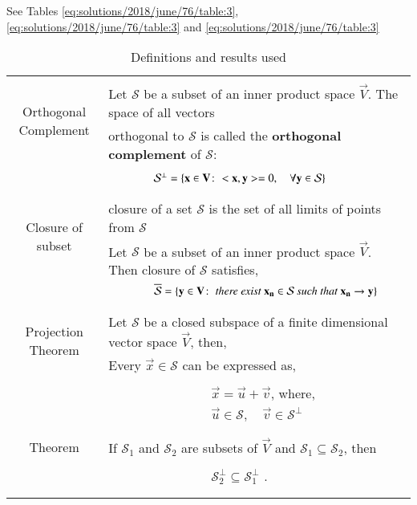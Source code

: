 See Tables     \ref{eq:solutions/2018/june/76/table:3},     
\ref{eq:solutions/2018/june/76/table:3} and     \ref{eq:solutions/2018/june/76/table:3}



\onecolumn
\begin{longtable}{|c|l|}
    \hline
	\multirow{3}{*}{Orthogonal Complement} 
	& \\
	& Let $\mathcal{S}$ be a subset of an inner product space $\vec{V}$. The space of all vectors\\
	&orthogonal to $\mathcal{S}$ is called the \textbf{orthogonal complement} of $\mathcal{S}$:\\
	&\\
	&$\qquad\qquad\mathcal{S}^{\perp}=\left\{\mathbf{x}\in\mathbf{V}\colon<\mathbf{x},\mathbf{y}>=0,\quad\forall \mathbf{y}\in\mathcal{S}\right\}$\\
	&\\
	\hline
	\multirow{3}{*}{Closure of subset} 
	& \\
	& closure of a set $\mathcal{S}$ is the set of all limits of points from $\mathcal{S}$\\
	& Let $\mathcal{S}$ be a subset of an inner product space $\vec{V}$. Then closure of $\mathcal{S}$ satisfies,\\
	&$\qquad\qquad\overline{\mathcal{S}}=\left\{\mathbf{y}\in\mathbf{V}\colon \textit{ there exist } \mathbf{x_n}\in\mathcal{S}\textit{ such that } \mathbf{x_n}\rightarrow \mathbf{y}\right\}$\\
	&\\
	\hline
	\multirow{3}{*}{Projection Theorem} 
	& \\
	&  Let $\mathcal{S}$ be a closed subspace of a finite dimensional vector space $\vec{V}$, then,\\
	&Every $\vec{x}\in \mathcal{S}$ can be expressed as,\\
	&\\
	&$\qquad\qquad\qquad\qquad \vec{x} = \vec{u} + \vec{v}$, where,\\
	&$\qquad\qquad\qquad\qquad \vec{u}\in \mathcal{S},\quad \vec{v} \in \mathcal{S}^{\perp}$\\
	&\\
	\hline
	\multirow{3}{*}{Theorem} 
	& \\
	& If $\mathcal{S}_1$ and $\mathcal{S}_2$ are subsets of $\vec{V}$ and $\mathcal{S}_1\subseteq \mathcal{S}_2$, then\\
	&\\
	&$\qquad\qquad\qquad\qquad\mathcal{S}_{2}^{\perp}\subseteq\mathcal{S}_{1}^{\perp}$
.\\
	&\\
	\hline
    \caption{Definitions and results used}
    \label{eq:solutions/2018/june/76/table:1}
\end{longtable}
